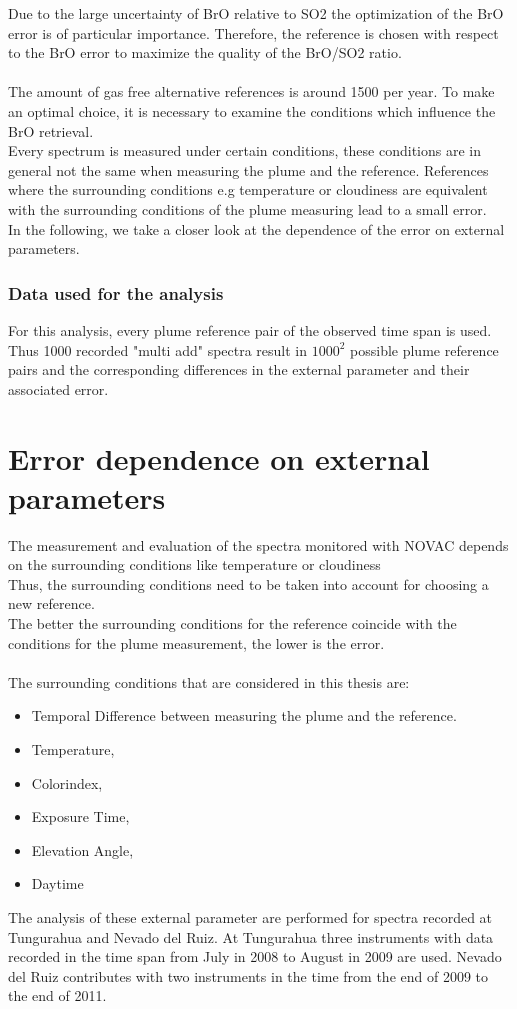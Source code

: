 Due to the large uncertainty of BrO relative to SO2 the optimization of the BrO error is of particular importance. Therefore, the reference is chosen with respect to the BrO error to maximize the quality of the BrO/SO2 ratio. \\
\\
The amount of gas free alternative references is around 1500 per year. To make an optimal choice, it is necessary to examine the conditions which influence the BrO retrieval.\\
Every spectrum is measured under certain conditions, these conditions are in general not the same when measuring the plume and the reference. References where the surrounding conditions e.g temperature or cloudiness are equivalent with the surrounding conditions of the  plume measuring lead to a small error.\\
In the following, we take a closer look at the dependence of the  error on external parameters. 
%
\subsubsection*{Data used for the analysis}
For this analysis, every plume reference pair of the observed time span is used. Thus 1000 recorded "multi add" spectra result in $1000^2$ possible plume reference pairs and the corresponding differences in the external parameter and their associated  error.


\section{ Error dependence on external parameters \label{Chap:BROErr}}
The measurement and evaluation of the spectra monitored with NOVAC depends on the surrounding conditions like temperature or cloudiness \citep{lubcke2014optical}\\
Thus, the surrounding conditions need to be taken into account for choosing a new reference.\\
The better the surrounding conditions for the reference coincide with the conditions for the plume measurement, the lower is the  error. \\
	\\
The surrounding conditions that are considered in this thesis are: 
	\begin{itemize}
		\item Temporal Difference between measuring the plume and the reference.
		\item Temperature, 
		\item Colorindex, 
		\item Exposure Time, 
		\item Elevation Angle, 
		\item Daytime 	
	\end{itemize}
The analysis of these external parameter are performed for spectra recorded at Tungurahua and Nevado del Ruiz. At Tungurahua three instruments with data recorded in the time span from July in 2008 to August in 2009 are used. Nevado del Ruiz contributes with two instruments in the time from the end of 2009 to the end of 2011.
%	
